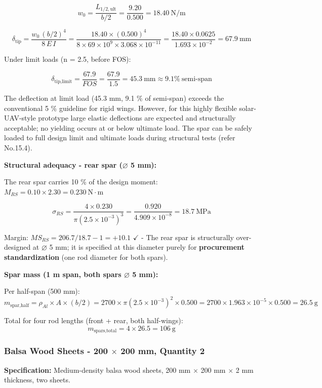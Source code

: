 \documentclass[10pt,a4paper]{article}
\begin{document}
\[
w_0 = \frac{L_{1/2,\text{ult}}}{b/2} = \frac{9.20}{0.500} = 18.40\ \text{N/m}
\]

\[
\delta_{\text{tip}} = \frac{w_0\,(b/2)^4}{8\,E\,I} = \frac{18.40 \times (0.500)^4}{8 \times 69 \times 10^9 \times 3.068 \times 10^{-11}} = \frac{18.40 \times 0.0625}{1.693 \times 10^{-2}} = 67.9\ \text{mm}
\]

Under limit loads (n = 2.5, before FOS):

\[
\delta_{\text{tip,limit}} = \frac{67.9}{FOS} = \frac{67.9}{1.5} = 45.3\ \text{mm} \approx 9.1\%\ \text{semi-span}
\]

The deflection at limit load (45.3 mm, 9.1 \% of semi-span) exceeds the conventional 5 \% guideline for rigid wings. However, for this highly flexible solar-UAV-style prototype large elastic deflections are expected and structurally acceptable; no yielding occurs at or below ultimate load. The spar can be safely loaded to full design limit and ultimate loads during structural tests (refer No.15.4).

\textbf{Structural adequacy - rear spar ($\varnothing$ 5 mm):}

The rear spar carries 10 \% of the design moment: $M_{RS} = 0.10 \times 2.30 = 0.230\ \text{N}\cdot\text{m}$

\[
\sigma_{RS} = \frac{4 \times 0.230}{\pi (2.5 \times 10^{-3})^3} = \frac{0.920}{4.909 \times 10^{-8}} = 18.7\ \text{MPa}
\]

Margin: $MS_{RS} = 206.7/18.7 - 1 = +10.1$ $\checkmark $ - The rear spar is structurally over-designed at $\varnothing$ 5 mm; it is specified at this diameter purely for \textbf{procurement standardization} (one rod diameter for both spars).

\textbf{Spar mass (1 m span, both spars $\varnothing$ 5 mm):}

Per half-span (500 mm):
\[
m_{\text{spar,half}} = \rho_{Al} \times A \times (b/2) = 2700 \times \pi (2.5 \times 10^{-3})^2 \times 0.500 = 2700 \times 1.963 \times 10^{-5} \times 0.500 = 26.5\ \text{g}
\]

Total for four rod lengths (front + rear, both half-wings):
\[
m_{\text{spars,total}} = 4 \times 26.5 = 106\ \text{g}
\]


\subsubsection{Balsa Wood Sheets - 200 ${\times}$ 200 mm, Quantity 2}


\textbf{Specification:} Medium-density balsa wood sheets, 200 mm ${\times}$ 200 mm ${\times}$ 2 mm thickness, two sheets.
\end{document}
